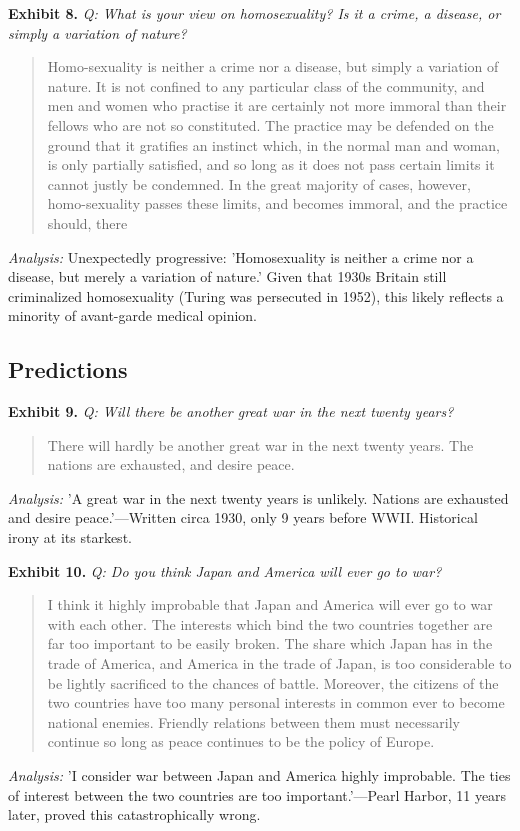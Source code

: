 \documentclass[11pt]{article}
\begin{document}
\noindent\textbf{Exhibit 8.} \textit{Q: What is your view on homosexuality? Is it a crime, a disease, or simply a variation of nature?}

\begin{quote}
\small Homo-sexuality is neither a crime nor a disease, but simply a variation of nature. It is not confined to any particular class of the community, and men and women who practise it are certainly not more immoral than their fellows who are not so constituted. The practice may be defended on the ground that it gratifies an instinct which, in the normal man and woman, is only partially satisfied, and so long as it does not pass certain limits it cannot justly be condemned. In the great majority of cases, however, homo-sexuality passes these limits, and becomes immoral, and the practice should, there
\end{quote}
\noindent\textit{Analysis:} Unexpectedly progressive: 'Homosexuality is neither a crime nor a disease, but merely a variation of nature.' Given that 1930s Britain still criminalized homosexuality (Turing was persecuted in 1952), this likely reflects a minority of avant-garde medical opinion.

\subsection*{Predictions}

\noindent\textbf{Exhibit 9.} \textit{Q: Will there be another great war in the next twenty years?}

\begin{quote}
\small There will hardly be another great war in the next twenty years. The nations are exhausted, and desire peace.
\end{quote}
\noindent\textit{Analysis:} 'A great war in the next twenty years is unlikely. Nations are exhausted and desire peace.'---Written circa 1930, only 9 years before WWII. Historical irony at its starkest.

\noindent\textbf{Exhibit 10.} \textit{Q: Do you think Japan and America will ever go to war?}

\begin{quote}
\small I think it highly improbable that Japan and America will ever go to war with each other. The interests which bind the two countries together are far too important to be easily broken. The share which Japan has in the trade of America, and America in the trade of Japan, is too considerable to be lightly sacrificed to the chances of battle. Moreover, the citizens of the two countries have too many personal interests in common ever to become national enemies. Friendly relations between them must necessarily continue so long as peace continues to be the policy of Europe.
\end{quote}
\noindent\textit{Analysis:} 'I consider war between Japan and America highly improbable. The ties of interest between the two countries are too important.'---Pearl Harbor, 11 years later, proved this catastrophically wrong.
\end{document}
